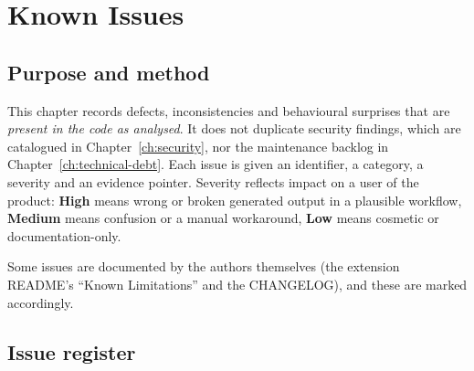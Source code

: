 \chapter{Known Issues}
\label{ch:known-issues}

\section{Purpose and method}

This chapter records defects, inconsistencies and behavioural surprises that are
\emph{present in the code as analysed}. It does not duplicate security findings,
which are catalogued in Chapter~\ref{ch:security}, nor the maintenance backlog in
Chapter~\ref{ch:technical-debt}. Each issue is given an identifier, a category, a
severity and an evidence pointer. Severity reflects impact on a user of the
product: \textbf{High} means wrong or broken generated output in a plausible
workflow, \textbf{Medium} means confusion or a manual workaround, \textbf{Low}
means cosmetic or documentation-only.

Some issues are documented by the authors themselves (the extension README's
``Known Limitations'' and the CHANGELOG), and these are marked accordingly.

\section{Issue register}

